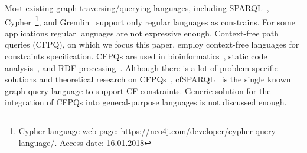 Most existing graph traversing/querying languages, including SPARQL~\cite{sparql}, Cypher~\footnote{Cypher language web page: \url{https://neo4j.com/developer/cypher-query-language/}. Access date: 16.01.2018}, and Gremlin~\cite{gremlin} support only regular languages as constrains. 
For some applications regular languages are not expressive enough. 
Context-free path queries (CFPQ), on which we focus this paper, employ context-free languages for constraints specification. 
CFPQs are used in bioinformatics~\cite{GraphQueryWithEarley}, static code analysis~\cite{Reps, Zheng, LabelFlowCFLReachability, specificationCFLReachability, JavaCFL}, and RDF processing~\cite{CFGonRDF}. 
Although there is a lot of problem-specific solutions and theoretical research on CFPQs~\cite{Yannakakis, ConjCFPathQuery, Hellings16, GrigorevR16, QueryGraphWithData, RegularDBQuery, GraphQueryWithEarley, graphDB}, cfSPARQL~\cite{CFGonRDF} is the single known graph query language to support CF constraints. 
Generic solution for the integration of CFPQs into general-purpose languages is not discussed enough. 


